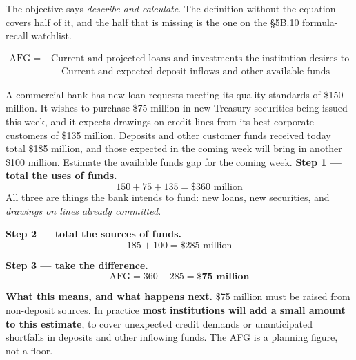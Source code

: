 \gapbadge
{}

\begin{lrgapbox}
The objective says \emph{describe and calculate}. The definition without the equation covers half of it, and the half that is missing is the one on the \S5B.10 formula-recall watchlist.
\end{lrgapbox}

\begin{lrfmlbox}
\begin{align*}
\text{AFG} \;=\;& \text{Current and projected loans and investments the institution desires to make} \\
&-\; \text{Current and expected deposit inflows and other available funds}
\end{align*}
\end{lrfmlbox}

\begin{lrexbox}
A commercial bank has new loan requests meeting its quality standards of \$150 million. It wishes to purchase \$75 million in new Treasury securities being issued this week, and it expects drawings on credit lines from its best corporate customers of \$135 million. Deposits and other customer funds received today total \$185 million, and those expected in the coming week will bring in another \$100 million. Estimate the available funds gap for the coming week.
\tcblower
\textbf{Step 1 --- total the uses of funds.}
\[ 150 + 75 + 135 = \$360 \text{ million} \]
All three are things the bank intends to fund: new loans, new securities, and \emph{drawings on lines already committed}.

\textbf{Step 2 --- total the sources of funds.}
\[ 185 + 100 = \$285 \text{ million} \]

\textbf{Step 3 --- take the difference.}
\[ \text{AFG} = 360 - 285 = \mathbf{\$75 \text{ million}} \]

\textbf{What this means, and what happens next.} \$75 million must be raised from non-deposit sources. In practice \textbf{most institutions will add a small amount to this estimate}, to cover unexpected credit demands or unanticipated shortfalls in deposits and other inflowing funds. The AFG is a planning figure, not a floor.
\end{lrexbox}

